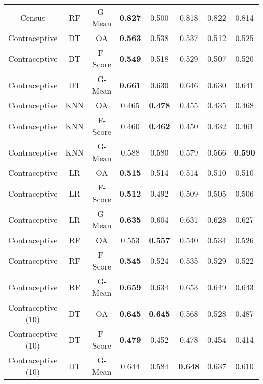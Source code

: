 \begin{longtable}{cccccccc}
            Census &         RF &  G-Mean & \textbf{0.827} &          0.500 &          0.818 &          0.822 &          0.814 \\
     Contraceptive &         DT &      OA & \textbf{0.563} &          0.538 &          0.537 &          0.512 &          0.525 \\
     Contraceptive &         DT & F-Score & \textbf{0.549} &          0.518 &          0.529 &          0.507 &          0.520 \\
     Contraceptive &         DT &  G-Mean & \textbf{0.661} &          0.630 &          0.646 &          0.630 &          0.641 \\
     Contraceptive &        KNN &      OA &          0.465 & \textbf{0.478} &          0.455 &          0.435 &          0.468 \\
     Contraceptive &        KNN & F-Score &          0.460 & \textbf{0.462} &          0.450 &          0.432 &          0.461 \\
     Contraceptive &        KNN &  G-Mean &          0.588 &          0.580 &          0.579 &          0.566 & \textbf{0.590} \\
     Contraceptive &         LR &      OA & \textbf{0.515} &          0.514 &          0.514 &          0.510 &          0.510 \\
     Contraceptive &         LR & F-Score & \textbf{0.512} &          0.492 &          0.509 &          0.505 &          0.506 \\
     Contraceptive &         LR &  G-Mean & \textbf{0.635} &          0.604 &          0.631 &          0.628 &          0.627 \\
     Contraceptive &         RF &      OA &          0.553 & \textbf{0.557} &          0.540 &          0.534 &          0.526 \\
     Contraceptive &         RF & F-Score & \textbf{0.545} &          0.524 &          0.535 &          0.529 &          0.522 \\
     Contraceptive &         RF &  G-Mean & \textbf{0.659} &          0.634 &          0.653 &          0.649 &          0.643 \\
Contraceptive (10) &         DT &      OA & \textbf{0.645} & \textbf{0.645} &          0.568 &          0.528 &          0.487 \\
Contraceptive (10) &         DT & F-Score & \textbf{0.479} &          0.452 &          0.478 &          0.454 &          0.414 \\
Contraceptive (10) &         DT &  G-Mean &          0.644 &          0.584 & \textbf{0.648} &          0.637 &          0.610 \\

\end{longtable}
